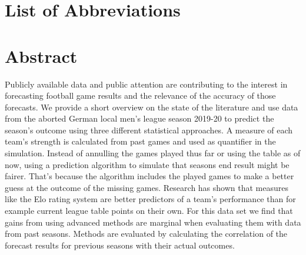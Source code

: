 \documentclass[12pt,a4paper]{article}
\begin{document}
\newpage
\listoffigures
{}

\listoftables
{}

\section*{List of Abbreviations}

\begin{adjustwidth}{1.5em}{0pt}

\begin{acronym}[dummyyyy]


\end{acronym}

\end{adjustwidth}

\restoregeometry

\newpage
{}
\hypertarget{abstract}{%
\section{Abstract}\label{abstract}}

Publicly available data and public attention are contributing to the
interest in forecasting football game results and the relevance of the
accuracy of those forecasts. We provide a short overview on the state of
the literature and use data from the aborted German local men's league
season 2019-20 to predict the season's outcome using three different
statistical approaches. A measure of each team's strength is calculated
from past games and used as quantifier in the simulation. Instead of
annulling the games played thus far or using the table as of now, using
a prediction algorithm to simulate that seasons end result might be
fairer. That's because the algorithm includes the played games to make a
better guess at the outcome of the missing games. Research has shown
that measures like the Elo rating system are better predictors of a
team's performance than for example current league table points on their
own. For this data set we find that gains from using advanced methods
are marginal when evaluating them with data from past seasons. Methods
are evaluated by calculating the correlation of the forecast results for
previous seasons with their actual outcomes.
\end{document}
